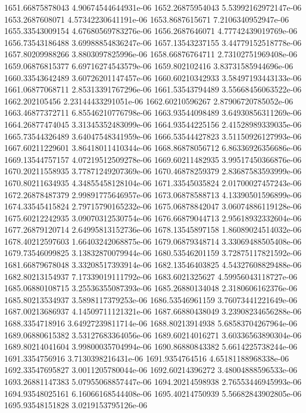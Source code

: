 {1651.66875878043 4.90674544644931e-06
1652.26875954043 5.53992162972147e-06
1653.2687608071 4.57342230641191e-06
1653.8687615671 7.2106340952947e-06
1655.33543009154 4.67680569783276e-06
1656.2687646071 4.77742439019769e-06
1656.73543186488 3.69988854836247e-06
1657.13543237155 3.44779152518778e-06
1657.80209988266 3.8803097825996e-06
1658.66876764711 2.73102751969408e-06
1659.06876815377 6.69716274543579e-06
1659.802102416 3.83731585944696e-06
1660.33543642489 3.60726201147457e-06
1660.60210342933 3.58497193443133e-06
1661.06877068711 2.85313391767296e-06
1661.53543794489 3.55668456063522e-06
1662.202105456 2.23144433291051e-06
1662.60210596267 2.87906720785052e-06
1663.46877372711 6.85546210776798e-06
1663.93544098489 3.64930856311269e-06
1664.26877474045 3.31345352483099e-06
1664.93544225156 2.41528989339035e-06
1665.73544326489 3.64047548341959e-06
1666.53544427823 3.51150926127993e-06
1667.60211229601 3.86418011410344e-06
1668.86878056712 6.86336926356686e-06
1669.13544757157 4.07219512509278e-06
1669.60211482935 3.99517450366876e-06
1670.20211558935 3.77871249207369e-06
1670.46878259379 2.83687583593999e-06
1670.80211634935 4.34855458128104e-06
1671.33545035824 2.01700027457243e-06
1672.26878487379 2.99891775646957e-06
1673.06878588713 4.13390501596899e-06
1674.33545415824 2.79715790165232e-06
1675.06878842047 3.06074886119128e-06
1675.60212242935 3.09070312530754e-06
1676.66879044713 2.95618932332604e-06
1677.26879120714 2.64995813152736e-06
1678.13545897158 1.86089024514032e-06
1678.40212597603 1.66403242068875e-06
1679.06879348714 3.33069488505408e-06
1679.73546099825 3.13832870079944e-06
1680.53546201159 3.72875117821592e-06
1681.66879678048 3.33208517393914e-06
1682.13546403825 4.54327608829488e-06
1682.80213154937 7.17339019111792e-06
1683.6021325627 4.59956043118727e-06
1685.06880108715 3.25536355087393e-06
1685.26880134048 2.3180606162376e-06
1685.80213534937 3.5898117379253e-06
1686.53546961159 3.76073441221649e-06
1687.00213686937 4.14509711121321e-06
1687.66880438049 3.23908234656288e-06
1688.3354718916 3.64927239811714e-06
1688.80213914938 5.68583704267964e-06
1689.06880615382 3.53127683364056e-06
1689.60214016271 3.60336563890304e-06
1689.80214041604 3.99800035704994e-06
1690.86880843382 5.6614225738244e-06
1691.3354756916 3.7130398216431e-06
1691.9354764516 4.65181188968338e-06
1692.33547695827 3.0011205780044e-06
1692.60214396272 3.48004888596533e-06
1693.26881147383 5.07955068857447e-06
1694.20214598938 2.76553446945993e-06
1694.93548025161 6.16066168544408e-06
1695.40214750939 5.56682843902805e-06
1695.93548151828 3.0219153795126e-06
}

